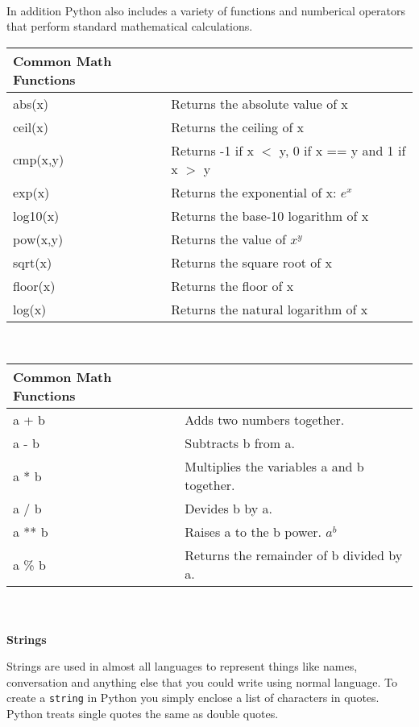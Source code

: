\documentclass[letterpaper,11pt]{article}
\begin{document}
\\
\par{In addition Python also includes a variety of functions and numberical
operators that perform standard mathematical calculations.}
\\
\begin{tabular}[t]{l l}
    \textbf{Common Math Functions} &                               \\
    \hline
    abs(x)   & Returns the absolute value of x                     \\
    ceil(x)  & Returns the ceiling of x                            \\
    cmp(x,y) & Returns -1 if x $<$ y, 0 if x == y and 1 if x $>$ y \\
    exp(x)   & Returns the exponential of x: $e^x$                 \\
    log10(x) & Returns the base-10 logarithm of x                  \\
    pow(x,y) & Returns the value of $x^y$                          \\
    sqrt(x)  & Returns the square root of x                        \\
    floor(x) & Returns the floor of x                              \\
    log(x)   & Returns the natural logarithm of x                  \\
\end{tabular}
\\
\begin{tabular}[t]{l l}
    \textbf{Common Math Functions} &                               \\
    \hline
    a + b  & Adds two numbers together.                 \\
    a - b  & Subtracts b from a.                        \\
    a * b  & Multiplies the variables a and b together. \\
    a / b  & Devides b by a.                            \\
    a ** b & Raises a to the b power. $a^b$             \\
    a \% b & Returns the remainder of b divided by a.   \\
\end{tabular}
\\ \\
\textbf{Strings}
\par{Strings are used in almost all languages to represent things like names,
conversation and anything else that you could write using normal language. To
create a \texttt{string} in Python you simply enclose a list of characters in
quotes. Python treats single quotes the same as double quotes.}
\end{document}
